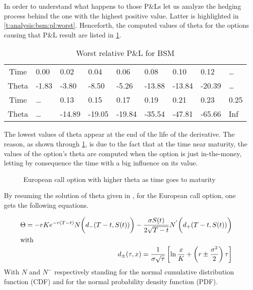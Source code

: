 \documentclass[12pt]{report}
\begin{document}
In order to understand what happens to those P\&Ls let us analyze the hedging process behind the one with the highest positive value. Latter is highlighted in \cref{t:analysis:bsm:pl:worst}.
Henceforth, the computed values of theta for the options causing that 
P\&L result are listed in \cref{t:analysis:bsm:pl:worst:theta}.

 
\begin{table}[h]
\centering
\begin{tabular}{c|llllllll}
  \hline
  \hline
  Time & 0.00 & 0.02 & 0.04 & 0.06 & 0.08 & 0.10 & 0.12 & \ldots\\ 
Theta & -1.83 & -3.80 & -8.50 & -5.26 & -13.88 & -13.84 & -20.39 & \ldots \\ 
   \hdashline
  Time & \ldots & 0.13 & 0.15 & 0.17 & 0.19 & 0.21 & 0.23 & 0.25 \\ 
  Theta & \ldots & -14.89 & -19.05 & -19.84 & -35.54 & -47.81 & -65.66 & Inf \\ 
   \hline
\end{tabular}
\caption{Worst relative P\&L for BSM} 
\label{t:analysis:bsm:pl:worst:theta}
\end{table}



The lowest values of theta appear at the end of the life of the derivative. 
The reason, as shown through \cref{p:analysis:gbm:pl:theta:high},  is due to the fact that at the time near maturity, the values of the option's theta are computed when the option is just in-the-money, letting by consequence the time with a big influence on its value.


\begin{figure}[h]
  \centering
  
  \caption{European call option with higher theta as time goes to maturity}
  \label{p:analysis:gbm:pl:theta:high}
\end{figure}



By resuming the solution of theta given in \citet{shreve}, for the European call option, one gets the following equations.

\begin{align}
  \Theta = -r K e^{-r (T-t)} N\bigg(d_{-}(T-t, S(t))\bigg) -
    \frac{\sigma S(t)}{2\sqrt{T-t}} N^{'}\bigg(d_{+}(T-t, S(t))\bigg) \label{eq:analysis:theta}\\
  \intertext{with}
  d_{\pm}(\tau, x) = \frac{1}{\sigma \sqrt{\tau}} \left [
    \ln\frac{x}{K} + \left( r \pm \frac{\sigma^2}{2} \right) \tau
  \right]\label{eq:analysis:d}
\end{align}
With $N$ and $N^{-}$ respectively standing for the normal cumulative distribution function (CDF) and for the normal probability density function (PDF). 
\end{document}
